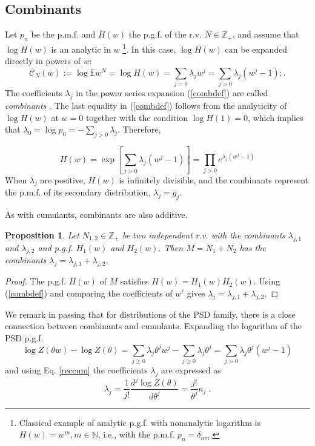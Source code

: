 \documentclass[a4paper,12pt]{amsart}
\newcommand{\E}{\mathbb{E}}
\newcommand{\N}{\mathbb{N}}
\newcommand{\Z}{\mathbb{Z}_{+}}
\newtheorem{Proposition}{Proposition}[section]
\theoremstyle{definition}
\theoremstyle{remark}
\begin{document}
\subsection{Combinants}\label{comsec}
Let $p_n$ be the p.m.f. and $H(w)$ the p.g.f. of the r.v. $N\in\Z$, and assume that $\log H(w)$ is an analytic in  $w$ \footnote{Classical example of analytic p.g.f. with nonanalytic logarithm is $H(w)=w^m, m\in \N$, i.e., with the p.m.f. $p_n=\delta_{nm}$.}. In this case, $\log H(w)$ can be expanded directly in powers of $w$: 
\begin{equation}\label{combdef}
 \mathcal{C}_N(w):= \log \E w^N= \log H(w)=\sum_{j=0} \lambda_j w^j=\sum_{j>0}\lambda_j( w^j -1);.
\end{equation}
The coefficients $\lambda_j$ in the power series expansion (\ref{combdef}) are called {\it combinants} \cite{Kauffmann:1978vw}. The last equality in (\ref{combdef}) follows from the analyticity of $\log H(w)$ at $w=0$ together with the condition $\log H(1)=0$, which implies that $\lambda_0=\log p_0=-\sum_{j>0}\lambda_j$. Therefore,

\[
H(w)=\exp[\sum_{j>0} \lambda_j(w^j-1)]=\prod_{j>0}e^{\lambda_j (w^j - 1)}
\]
When $\lambda_j$ are positive, $H(w)$ is infinitely divisible, and the combinants represent the p.m.f. of its secondary distribution, $\lambda_j=g_j$. 


As with cumulants, combinants are also additive.
\begin{Proposition}\label{addcomb}
Let $N_{1,2}\in \Z $ be two independent r.v. with the combinants $\lambda_{j,1}$ and $\lambda_{j,2}$ and p.g.f. $H_1(w)$ and $H_2(w)$. Then  $M=N_1+N_2$ has the combinants $\lambda_{j}=\lambda_{j,1}+\lambda_{j,2}$.
\end{Proposition}
\begin{proof}
The p.g.f. $H(w)$ of $M$ satisfies $H(w)=H_1(w)H_2(w)$. Using (\ref{combdef})  and comparing the coefficients of $w^{\ell}$ gives $\lambda_{j}=\lambda_{j,1}+\lambda_{j,2}$.
\end{proof}

 We remark in passing that for distributions of the PSD family, there is a close connection between combinants and cumulants. Expanding the logarithm of the PSD p.g.f.  
\[
\log Z(\theta w) -\log Z(\theta)
=\sum_{j\geq 0}\lambda_j\theta^jw^j -\sum_{j\geq0}\lambda_j\theta^j
=\sum_{j> 0}\lambda_j\theta^j(w^j-1) 
\]
 and using Eq. \ref{reccum} the coefficients $\lambda_j$ are expressed as
\begin{equation}\label{PSDcomb}   
\lambda_j 
=\frac{1}{j!}\frac{d^{j} \log Z(\theta )}{d\theta^j}=
\frac{j!}{\theta^{j}}\kappa_{j}\;.
\end{equation}
\end{document}
